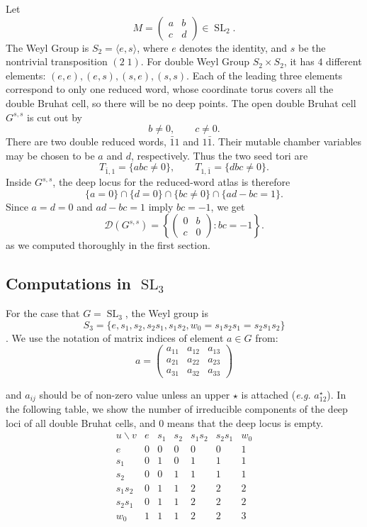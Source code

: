 \documentclass[12pt]{amsart}
\newcommand{\SL}{\operatorname{SL}}
\newcommand{\cD}{\mathcal D}
\theoremstyle{plain}
\theoremstyle{definition}
\theoremstyle{remark}
\begin{document}
Let
\[
   M=\begin{pmatrix}a&b\\ c&d\end{pmatrix}\in \SL_2.
\]
The Weyl Group is $S_2=\langle e,s\rangle$, where $e$ denotes the identity, and $s$ be the nontrivial transposition $(2\; 1)$. For double Weyl Group $S_2\times S_2$, it has $4$ different elements: $(e,e), (e,s), (s,e), (s,s)$. Each of the leading three elements correspond to only one reduced word, whose coordinate torus covers all the double Bruhat cell, so there will be no deep points. 
The open double Bruhat cell $G^{s,s}$ is cut out by
\[
   b\neq0,
   \qquad
   c\neq0.
\]
There are two double reduced words, $\bar11$ and $1\bar1$.  Their mutable chamber variables may be chosen to be $a$ and $d$, respectively.  Thus the two seed tori are
\[
   T_{\bar1,1}=\{a b c\neq0\},
   \qquad
   T_{1,\bar1}=\{d b c\neq0\}.
\]
Inside $G^{s,s}$, the deep locus for the reduced-word atlas is therefore
\[
   \{a=0\}\cap\{d=0\}\cap\{bc\neq0\}\cap\{ad-bc=1\}.
\]
Since $a=d=0$ and $ad-bc=1$ imply $bc=-1$, we get
\[
   \cD(G^{s,s})=
   \left\{
   \begin{pmatrix}
   0&b\\ c&0
   \end{pmatrix}:bc=-1
   \right\}.
\]
as we computed thoroughly in the first section.

\subsection[Computations in SL3]{Computations in \texorpdfstring{$\SL_3$}{SL3}}
\medskip

For the case that $G=\SL_3$, the Weyl group is $$S_3=\{e, s_1, s_2, s_2s_1, s_1s_2, w_0=s_1s_2s_1=s_2s_1s_2\}$$. We use the notation of matrix indices of element $a\in G$ from:
\[
a=\begin{pmatrix}
a_{11} &a_{12} &a_{13}\\
a_{21} &a_{22} &a_{23}\\
a_{31} &a_{32} &a_{33}
\end{pmatrix}
\]

and $a_{ij}$ should be of non-zero value unless an upper $\star$ is attached (\textit{e.g.}  $ a_{12}^\star$). In the following table, we show the number of irreducible components of the deep loci of all double Bruhat cells, and $0$ means that the deep locus is empty.
\[
\begin{array}{c|cccccc}
 u\backslash v & e&s_1&s_2&s_1s_2&s_2s_1&w_0\\ \hline
 e        &0&0&0&0&0&1\\
 s_1      &0&1&0&1&1&1\\
 s_2      &0&0&1&1&1&1\\
 s_1s_2   &0&1&1&2&2&2\\
 s_2s_1   &0&1&1&2&2&2\\
 w_0      &1&1&1&2&2&3
\end{array}
\]
\end{document}
